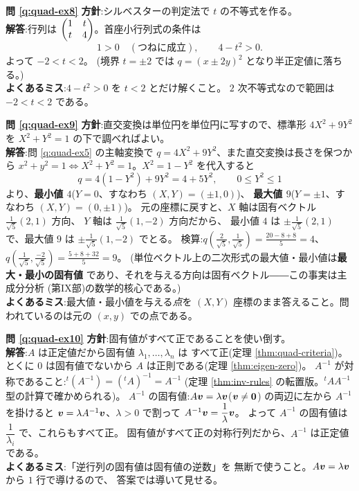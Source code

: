 \bigskip
\noindent\textbf{問 \ref{q:quad-ex8}}\quad
\textbf{方針}:シルベスターの判定法で $t$ の不等式を作る。\\
\textbf{解答}:行列は $\begin{pmatrix}1 & t \\ t & 4\end{pmatrix}$。首座小行列式の条件は
\[
1 > 0 \quad(\text{つねに成立}), \qquad 4 - t^2 > 0.
\]
よって $-2 < t < 2$。
(境界 $t = \pm 2$ では $q = (x \pm 2y)^2$ となり半正定値に落ちる。)\\
\textbf{よくあるミス}:$4 - t^2 > 0$ を $t < 2$ とだけ解くこと。
$2$ 次不等式なので範囲は $-2 < t < 2$ である。

\bigskip
\noindent\textbf{問 \ref{q:quad-ex9}}\quad
\textbf{方針}:直交変換は単位円を単位円に写すので、標準形
$4X^2 + 9Y^2$ を $X^2 + Y^2 = 1$ の下で調べればよい。\\
\textbf{解答}:問 \ref{q:quad-ex5} の主軸変換で
$q = 4X^2 + 9Y^2$、また直交変換は長さを保つから
$x^2 + y^2 = 1 \iff X^2 + Y^2 = 1$。$X^2 = 1 - Y^2$ を代入すると
\[
q = 4(1 - Y^2) + 9Y^2 = 4 + 5Y^2, \qquad 0 \le Y^2 \le 1
\]
より、\textbf{最小値 $4$}($Y = 0$、すなわち $(X, Y) = (\pm 1, 0)$)、
\textbf{最大値 $9$}($Y = \pm 1$、すなわち $(X, Y) = (0, \pm 1)$)。
元の座標に戻すと、$X$ 軸は固有ベクトル $\frac{1}{\sqrt{5}}(2, 1)$ 方向、
$Y$ 軸は $\frac{1}{\sqrt{5}}(1, -2)$ 方向だから、
最小値 $4$ は $\pm\frac{1}{\sqrt{5}}(2, 1)$ で、最大値 $9$ は
$\pm\frac{1}{\sqrt{5}}(1, -2)$ でとる。
検算:$q\left(\frac{2}{\sqrt{5}}, \frac{1}{\sqrt{5}}\right)
= \frac{20 - 8 + 8}{5} = 4$、
$q\left(\frac{1}{\sqrt{5}}, \frac{-2}{\sqrt{5}}\right)
= \frac{5 + 8 + 32}{5} = 9$。
(単位ベクトル上の二次形式の最大値・最小値は\textbf{最大・最小の固有値}
であり、それを与える方向は固有ベクトル――この事実は主成分分析
(第IX部)の数学的核心である。)\\
\textbf{よくあるミス}:最大値・最小値を与える\emph{点}を
$(X, Y)$ 座標のまま答えること。問われているのは元の $(x, y)$ での点である。

\bigskip
\noindent\textbf{問 \ref{q:quad-ex10}}\quad
\textbf{方針}:固有値がすべて正であることを使い倒す。\\
\textbf{解答}:$A$ は正定値だから固有値 $\lambda_1, \dots, \lambda_n$ は
すべて正(定理 \ref{thm:quad-criteria})。とくに $0$ は固有値でないから
$A$ は正則である(定理 \ref{thm:eigen-zero})。
$A^{-1}$ が対称であること:${}^t(A^{-1}) = ({}^t\!A)^{-1} = A^{-1}$
(定理 \ref{thm:inv-rules} の転置版。${}^t\!A A^{-1}$ 型の計算で確かめられる)。
$A^{-1}$ の固有値:$A\bm{v} = \lambda\bm{v}$($\bm{v} \neq \bm{0}$)
の両辺に左から $A^{-1}$ を掛けると
$\bm{v} = \lambda A^{-1}\bm{v}$、$\lambda > 0$ で割って
$A^{-1}\bm{v} = \dfrac{1}{\lambda}\bm{v}$。
よって $A^{-1}$ の固有値は $\dfrac{1}{\lambda_i}$ で、これらもすべて正。
固有値がすべて正の対称行列だから、$A^{-1}$ は正定値である。\\
\textbf{よくあるミス}:「逆行列の固有値は固有値の逆数」を
無断で使うこと。$A\bm{v} = \lambda\bm{v}$ から $1$ 行で導けるので、
答案では導いて見せる。


